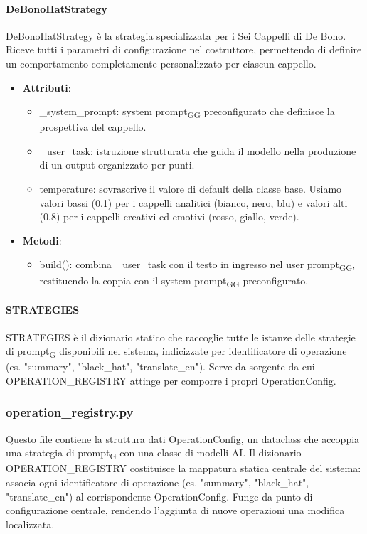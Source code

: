 \documentclass[11pt,a4paper]{article}
\newcommand{\gls}[1]{#1\textsubscript{G}}
\begin{document}
\paragraph{DeBonoHatStrategy} 
DeBonoHatStrategy è la strategia specializzata per i Sei Cappelli di De Bono. Riceve tutti i parametri di configurazione nel costruttore, permettendo di definire un comportamento completamente personalizzato per ciascun cappello.
\begin{itemize}

\item \textbf{Attributi}:

\begin{itemize}
\item \_system\_prompt: \gls{system \gls{prompt}} preconfigurato che definisce la prospettiva del cappello.
\item \_user\_task: istruzione strutturata che guida il modello nella produzione di un output organizzato per punti.
\item temperature: sovrascrive il valore di default della classe base. Usiamo valori bassi (0.1) per i cappelli analitici (bianco, nero, blu) e valori alti (0.8) per i cappelli creativi ed emotivi (rosso, giallo, verde).
\end{itemize}

\item \textbf{Metodi}: 

\begin{itemize}
\item build(): combina \_user\_task con il testo in ingresso nel \gls{user \gls{prompt}}, restituendo la coppia con il \gls{system \gls{prompt}} preconfigurato.
\end{itemize}

\end{itemize}

\paragraph{STRATEGIES}
STRATEGIES è il dizionario statico che raccoglie tutte le istanze delle strategie di \gls{prompt} disponibili nel sistema, indicizzate per identificatore di operazione (es. "summary", "black\_hat", "translate\_en"). Serve da sorgente da cui OPERATION\_REGISTRY attinge per comporre i propri OperationConfig.

\subsubsection{operation\_registry.py}
Questo file contiene la struttura dati OperationConfig, un dataclass che accoppia una strategia di \gls{prompt} con una classe di modelli AI. Il dizionario OPERATION\_REGISTRY costituisce la mappatura statica centrale del sistema: associa ogni identificatore di operazione (es. "summary", "black\_hat", "translate\_en") al corrispondente OperationConfig. Funge da punto di configurazione centrale, rendendo l'aggiunta di nuove operazioni una modifica localizzata.
\end{document}
